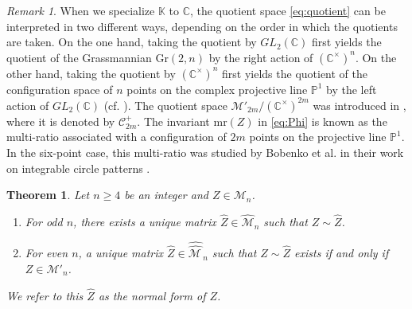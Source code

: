 \documentclass[11pt]{amsart}
\theoremstyle{plain}
\newtheorem{thm}[proposition]{Theorem}
\theoremstyle{definition}
\theoremstyle{remark}
\newtheorem{remark}[proposition]{Remark}
\begin{document}

\begin{remark}
When we specialize $\mathbb{K}$ to $\mathbb{C}$, the quotient space
\eqref{eq:quotient} can be interpreted in two different ways, depending on the
order in which the quotients are taken.
On the one hand, taking the quotient by $GL_2(\mathbb{C})$ first yields the quotient
of the Grassmannian $\mathrm{Gr}(2, n)$ by the right action of $(\mathbb{C}^\times)^n$.
On the other hand, taking the quotient by $(\mathbb{C}^\times)^n$ first yields the quotient
of the configuration space of $n$ points on the complex projective line
$\mathbb{P}^1$ by the left action of $GL_2(\mathbb{C})$
(cf. \cite{Aomoto1977}).
The quotient space $\mathcal{M}'_{2m}/(\mathbb{C}^\times)^{2m}$ was introduced in \cite{Genoud2021}, where it is
denoted by $\mathcal{C}^{+}_{2m}$.
The invariant $\mathrm{mr}(Z)$ in \eqref{eq:Phi} is known as the multi-ratio
associated with a configuration of $2m$ points on the projective line
$\mathbb{P}^1$.
In the six-point case, this multi-ratio was studied by Bobenko et al. in their
work on integrable circle patterns \cite{BHS2002,BobenkoHoffmann2001}.
\end{remark}


\begin{thm} \label{thm:normalize}
    Let $n \geq 4$ be an integer and $Z \in \mathcal{M}_n$.
\begin{enumerate}[label=\textup{(\roman*)}]
    \item For odd $n$, there exists a unique matrix $\widehat{Z} \in \widehat{\mathcal{M}}_n$ such
    that $Z \sim \widehat{Z}$.
    \item For even $n$, a unique matrix $\widehat{Z} \in \widehat{\widehat{\mathcal{M\,}}}_{n}$ such that
    $Z \sim \widehat{Z}$ exists if and only if $Z \in \mathcal{M}'_n$.
\end{enumerate}
We refer to this $\widehat{Z}$ as the normal form of $Z$.
\end{thm}
\end{document}
